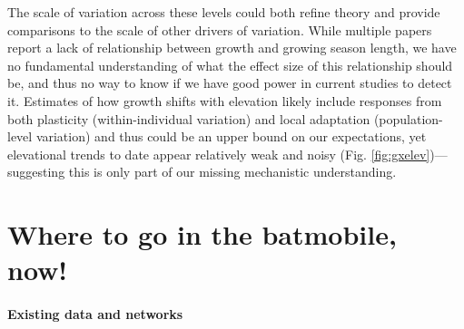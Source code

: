 \documentclass[11pt]{article}
\begin{document}

The scale of variation across these levels could both refine theory and provide comparisons to the scale of other drivers of variation. While multiple papers report a lack of relationship between growth and growing season length, we have no fundamental understanding of what the effect size of this relationship should be, and thus no way to know if we have good power in current studies to detect it. Estimates of how growth shifts with elevation likely include responses from both plasticity (within-individual variation) and local adaptation (population-level variation) and thus could be an upper bound on our expectations, yet elevational trends to date appear relatively weak and noisy (Fig. \ref{fig:gxelev})---suggesting this is only part of our missing mechanistic understanding. 

\section*{Where to go in the batmobile, now!}

\paragraph{Existing data and networks}
\end{document}
